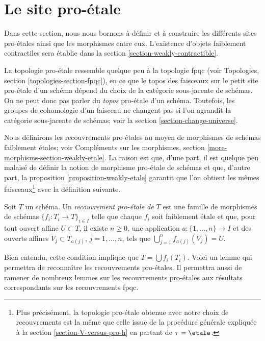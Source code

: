 \section{Le site pro-\'etale}
\label{section-proetale}

\noindent
Dans cette section, nous nous bornons à définir et à construire
les différents sites pro-\'etales ainsi que les morphismes entre eux. L'existence
d'objets faiblement contractiles sera établie dans la
section \ref{section-weakly-contractible}.

\medskip\noindent
La topologie pro-\'etale ressemble quelque peu à
la topologie fpqc (voir Topologies, section \ref{topologies-section-fpqc}),
en ce que le topos des faisceaux sur le petit site pro-\'etale d'un schéma
dépend du choix de la catégorie sous-jacente de schémas. On ne peut donc pas
parler du {\it topos} pro-\'etale d'un schéma. Toutefois, les
groupes de cohomologie d'un faisceau ne changent pas si l'on agrandit
la catégorie sous-jacente de schémas; voir la section \ref{section-change-universe}.

\medskip\noindent
Nous définirons les recouvrements pro-\'etales au moyen de morphismes de schémas faiblement \'etales;
voir Compléments sur les morphismes, section \ref{more-morphisms-section-weakly-etale}.
La raison est que, d'une part, il est quelque peu malaisé de définir
la notion de morphisme pro-\'etale de schémas et que, d'autre part, la
proposition \ref{proposition-weakly-etale}
garantit que l'on obtient les mêmes faisceaux\footnote{Plus précisément,
la topologie pro-\'etale obtenue avec notre choix de recouvrements
est la même que celle issue de la procédure générale expliquée
à la section \ref{section-V-versus-pro-h} en partant de $\tau = \etale$.}
avec la définition suivante.

\begin{definition}
\label{definition-fpqc-covering}
Soit $T$ un schéma. Un {\it recouvrement pro-\'etale de $T$} est une famille
de morphismes de schémas $\{f_i : T_i \to T\}_{i \in I}$
telle que chaque $f_i$ soit faiblement \'etale et que, pour tout ouvert affine
$U \subset T$, il existe $n \geq 0$, une application
$a : \{1, \ldots, n\} \to I$ et des ouverts affines
$V_j \subset T_{a(j)}$, $j = 1, \ldots, n$,
tels que $\bigcup_{j = 1}^n f_{a(j)}(V_j) = U$.
\end{definition}

\noindent
Bien entendu, cette condition implique que $T = \bigcup f_i(T_i)$.
Voici un lemme qui permettra de reconnaître les recouvrements pro-\'etales.
Il permettra aussi de ramener de nombreux lemmes sur les recouvrements pro-\'etales
aux résultats correspondants sur les recouvrements fpqc.

